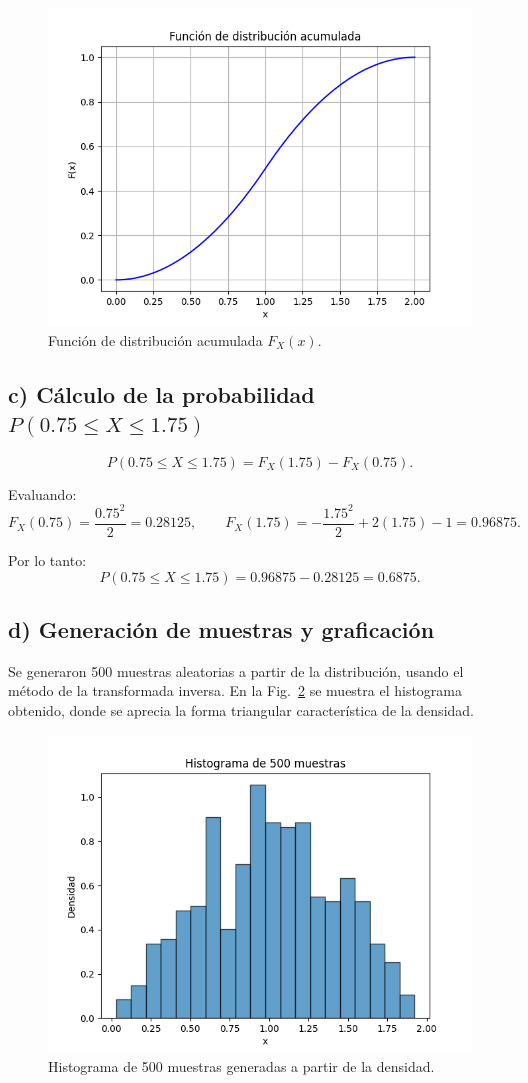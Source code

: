 \begin{figure}[H]
    \centering
    \includegraphics[width=0.6\linewidth]{imagenes/Actividad_3/cdf.png}
    \caption{Función de distribución acumulada \(F_X(x)\).}
    \label{fig:cdf}
\end{figure}

\subsection*{c) Cálculo de la probabilidad \( P(0.75 \leq X \leq 1.75) \)}

\[
P(0.75 \leq X \leq 1.75) = F_X(1.75) - F_X(0.75).
\]

Evaluando:
\[
F_X(0.75) = \frac{0.75^2}{2} = 0.28125,
\qquad
F_X(1.75) = -\frac{1.75^2}{2} + 2(1.75) - 1 = 0.96875.
\]

Por lo tanto:
\[
P(0.75 \leq X \leq 1.75) = 0.96875 - 0.28125 = 0.6875.
\]

\subsection*{d) Generación de muestras y graficación}

Se generaron 500 muestras aleatorias a partir de la distribución, usando el método de la transformada inversa.  
En la Fig.~\ref{fig:histograma} se muestra el histograma obtenido, donde se aprecia la forma triangular característica de la densidad.

\begin{figure}[H]
    \centering
    \includegraphics[width=0.6\linewidth]{imagenes/Actividad_3/histograma.png}
    \caption{Histograma de 500 muestras generadas a partir de la densidad.}
    \label{fig:histograma}
\end{figure}

